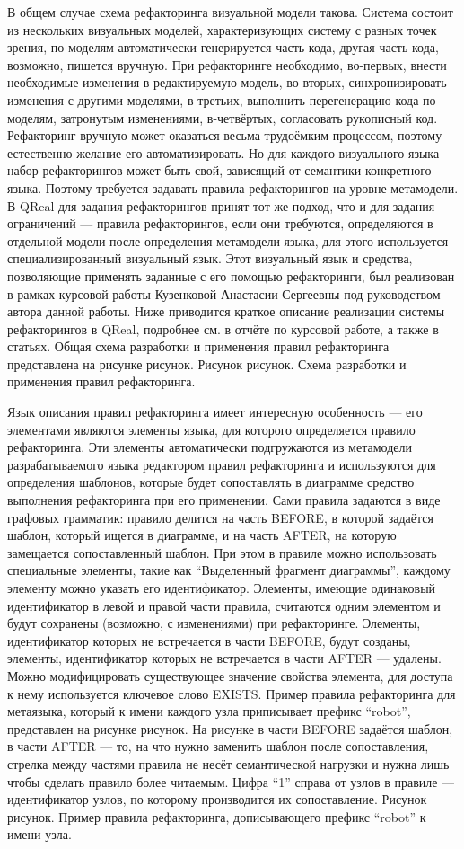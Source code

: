 	В общем случае схема рефакторинга визуальной модели такова. Система состоит из нескольких визуальных моделей, характеризующих систему с разных точек зрения, по моделям автоматически генерируется часть кода, другая часть кода, возможно, пишется вручную. При рефакторинге необходимо, во-первых, внести необходимые изменения в редактируемую модель, во-вторых, синхронизировать изменения с другими моделями, в-третьих, выполнить перегенерацию кода по моделям, затронутым изменениями, в-четвёртых, согласовать рукописный код. Рефакторинг вручную может оказаться весьма трудоёмким процессом, поэтому естественно желание его автоматизировать. Но для каждого визуального языка набор рефакторингов может быть свой, зависящий от семантики конкретного языка. Поэтому требуется задавать правила рефакторингов на уровне метамодели. В QReal для задания рефакторингов принят тот же подход, что и для задания ограничений --- правила рефакторингов, если они требуются, определяются в отдельной модели после определения метамодели языка, для этого используется специализированный визуальный язык. Этот визуальный язык и средства, позволяющие применять заданные с его помощью рефакторинги, был реализован в рамках курсовой работы Кузенковой Анастасии Сергеевны под руководством автора данной работы. Ниже приводится краткое описание реализации системы рефакторингов в QReal, подробнее см. в отчёте по курсовой работе, а также в статьях. Общая схема разработки и применения правил рефакторинга представлена на рисунке рисунок.
Рисунок рисунок. Схема разработки и применения правил рефакторинга.

	Язык описания правил рефакторинга имеет интересную особенность --- его элементами являются элементы языка, для которого определяется правило рефакторинга. Эти элементы автоматически подгружаются из метамодели разрабатываемого языка редактором правил рефакторинга и используются для определения шаблонов, которые будет сопоставлять в диаграмме средство выполнения рефакторинга при его применении. Сами правила задаются в виде графовых грамматик: правило делится на часть BEFORE, в которой задаётся шаблон, который ищется в диаграмме, и на часть AFTER, на которую замещается сопоставленный шаблон. При этом в правиле можно использовать специальные элементы, такие как “Выделенный фрагмент диаграммы”, каждому элементу можно указать его идентификатор. Элементы, имеющие одинаковый идентификатор в левой и правой части правила, считаются одним элементом и будут сохранены (возможно, с изменениями) при рефакторинге. Элементы, идентификатор которых не встречается в части BEFORE, будут созданы, элементы, идентификатор которых не встречается в части AFTER --- удалены. Можно модифицировать существующее значение свойства элемента, для доступа к нему используется ключевое слово EXISTS. Пример правила рефакторинга для метаязыка, который к имени каждого узла приписывает префикс “robot”, представлен на рисунке рисунок. На рисунке в части BEFORE задаётся шаблон, в части AFTER --- то, на что нужно заменить шаблон после сопоставления, стрелка между частями правила не несёт семантической нагрузки и нужна лишь чтобы сделать правило более читаемым. Цифра “1” справа от узлов в правиле --- идентификатор узлов, по которому производится их сопоставление.
Рисунок рисунок. Пример правила рефакторинга, дописывающего префикс “robot” к имени узла.

